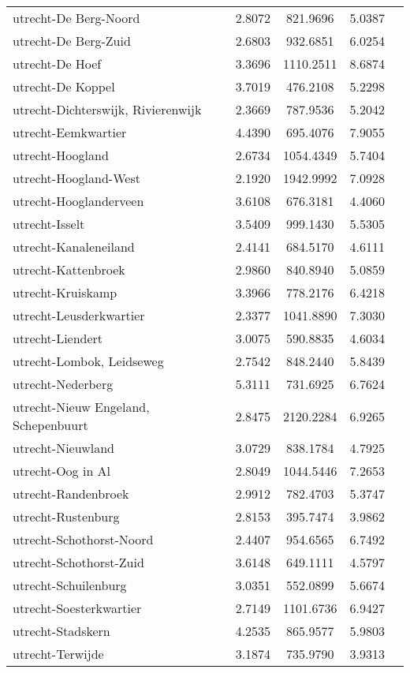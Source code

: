\begin{longtable}{llccc}
utrecht-De Berg-Noord & 2.8072 & 821.9696 & 5.0387 \\
utrecht-De Berg-Zuid & 2.6803 & 932.6851 & 6.0254 \\
utrecht-De Hoef & 3.3696 & 1110.2511 & 8.6874 \\
utrecht-De Koppel & 3.7019 & 476.2108 & 5.2298 \\
utrecht-Dichterswijk, Rivierenwijk & 2.3669 & 787.9536 & 5.2042 \\
utrecht-Eemkwartier & 4.4390 & 695.4076 & 7.9055 \\
utrecht-Hoogland & 2.6734 & 1054.4349 & 5.7404 \\
utrecht-Hoogland-West & 2.1920 & 1942.9992 & 7.0928 \\
utrecht-Hooglanderveen & 3.6108 & 676.3181 & 4.4060 \\
utrecht-Isselt & 3.5409 & 999.1430 & 5.5305 \\
utrecht-Kanaleneiland & 2.4141 & 684.5170 & 4.6111 \\
utrecht-Kattenbroek & 2.9860 & 840.8940 & 5.0859 \\
utrecht-Kruiskamp & 3.3966 & 778.2176 & 6.4218 \\
utrecht-Leusderkwartier & 2.3377 & 1041.8890 & 7.3030 \\
utrecht-Liendert & 3.0075 & 590.8835 & 4.6034 \\
utrecht-Lombok, Leidseweg & 2.7542 & 848.2440 & 5.8439 \\
utrecht-Nederberg & 5.3111 & 731.6925 & 6.7624 \\
utrecht-Nieuw Engeland, Schepenbuurt & 2.8475 & 2120.2284 & 6.9265 \\
utrecht-Nieuwland & 3.0729 & 838.1784 & 4.7925 \\
utrecht-Oog in Al & 2.8049 & 1044.5446 & 7.2653 \\
utrecht-Randenbroek & 2.9912 & 782.4703 & 5.3747 \\
utrecht-Rustenburg & 2.8153 & 395.7474 & 3.9862 \\
utrecht-Schothorst-Noord & 2.4407 & 954.6565 & 6.7492 \\
utrecht-Schothorst-Zuid & 3.6148 & 649.1111 & 4.5797 \\
utrecht-Schuilenburg & 3.0351 & 552.0899 & 5.6674 \\
utrecht-Soesterkwartier & 2.7149 & 1101.6736 & 6.9427 \\
utrecht-Stadskern & 4.2535 & 865.9577 & 5.9803 \\
utrecht-Terwijde & 3.1874 & 735.9790 & 3.9313 \\

\end{longtable}
